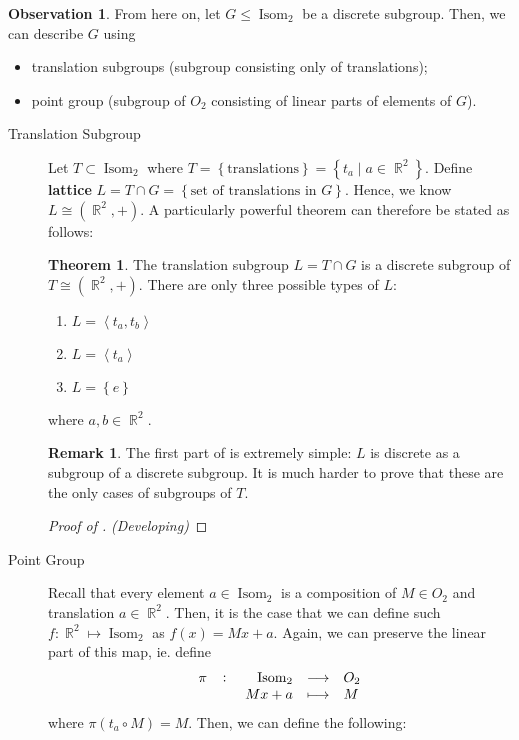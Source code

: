 \documentclass[11pt]{amsart} %
\theoremstyle{definition}
\newtheorem{theorem}[definition]{Theorem}
\newtheorem{obs}[definition]{Observation}
\theoremstyle{definition}
\newtheorem{remark}[definition]{Remark}
\DeclareMathOperator{\R}{\mathbb{R}}
\DeclareMathOperator{\isom}{Isom}
\numberwithin{equation}{section}
\begin{document}
\begin{obs}
	From here on, let $G \leq \isom_2$ be a discrete subgroup. Then, we can describe $G$ using
	\begin{itemize}%
		\item translation subgroups (subgroup consisting only of translations);
		\item point group (subgroup of $O_2$ consisting of linear parts of elements of $G$).
	\end{itemize}
\end{obs}

\begin{description}
	\item[Translation Subgroup] Let $T \subset \isom_2$ where $T = \left\{ \text{translations} \right\} = \left\{ t_a \mid a \in \R^2 \right\}$. Define \textbf{lattice} $L = T \cap G = \left\{ \text{set of translations in } G \right\}$. Hence, we know $L \cong (\R^2,+)$. A particularly powerful theorem can therefore be stated as follows:
	
	\begin{theorem}
		\label{thmclassificationlattice}
		The translation subgroup $L = T \cap G$ is a discrete subgroup of $T \cong (\R^2,+)$. There are only three possible types of $L$:
		\begin{enumerate}%
			\item $L = \left\langle t_a ,t_b \right\rangle$
			\item $L = \left\langle t_a \right\rangle$
			\item $L = \left\{ e \right\}$			
		\end{enumerate}
		where $a,b \in \R^2$.
	\end{theorem}
	
	\begin{remark}
		The first part of  is extremely simple: $L$ is discrete as a subgroup of a discrete subgroup. It is much harder to prove that these are the only cases of subgroups of $T$.
	\end{remark}
	
	\begin{proof}[Proof of ]
		\textit{(Developing)}
	\end{proof}

	\item[Point Group] Recall that every element $a\in \isom_2$ is a composition of $M \in O_2$ and translation $a \in \R^2$. Then, it is the case that we can define such $f : \R^2 \mapsto \isom_2 $ as $f(x) = Mx + a$. Again, we can preserve the linear part of this map, ie. define
	$$\fullfunction{\pi}{\isom_2}{O_2}{Mx + a}{M}$$
	where $\pi \left( t_a \circ M \right) = M$. Then, we can define the following:
	

\end{description}
\end{document}
